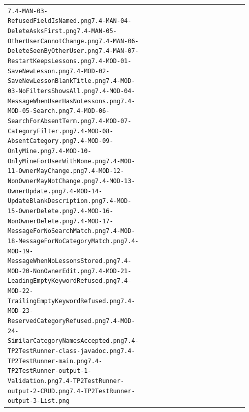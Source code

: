 \documentclass[10pt]{article}
\begin{document}
\begin{longtable}{@{}>{\raggedright\arraybackslash}p{0.07\linewidth} >{\raggedright\arraybackslash}p{0.33\linewidth} >{\raggedright\arraybackslash}p{0.54\linewidth}@{}}
\texttt{7.4-MAN-03-RefusedFieldIsNamed.png}\newline \texttt{7.4-MAN-04-DeleteAsksFirst.png}\newline \texttt{7.4-MAN-05-OtherUserCannotChange.png}\newline \texttt{7.4-MAN-06-DeleteSeenByOtherUser.png}\newline \texttt{7.4-MAN-07-RestartKeepsLessons.png}\newline \texttt{7.4-MOD-01-SaveNewLesson.png}\newline \texttt{7.4-MOD-02-SaveNewLessonBlankTitle.png}\newline \texttt{7.4-MOD-03-NoFiltersShowsAll.png}\newline \texttt{7.4-MOD-04-MessageWhenUserHasNoLessons.png}\newline \texttt{7.4-MOD-05-Search.png}\newline \texttt{7.4-MOD-06-SearchForAbsentTerm.png}\newline \texttt{7.4-MOD-07-CategoryFilter.png}\newline \texttt{7.4-MOD-08-AbsentCategory.png}\newline \texttt{7.4-MOD-09-OnlyMine.png}\newline \texttt{7.4-MOD-10-OnlyMineForUserWithNone.png}\newline \texttt{7.4-MOD-11-OwnerMayChange.png}\newline \texttt{7.4-MOD-12-NonOwnerMayNotChange.png}\newline \texttt{7.4-MOD-13-OwnerUpdate.png}\newline \texttt{7.4-MOD-14-UpdateBlankDescription.png}\newline \texttt{7.4-MOD-15-OwnerDelete.png}\newline \texttt{7.4-MOD-16-NonOwnerDelete.png}\newline \texttt{7.4-MOD-17-MessageForNoSearchMatch.png}\newline \texttt{7.4-MOD-18-MessageForNoCategoryMatch.png}\newline \texttt{7.4-MOD-19-MessageWhenNoLessonsStored.png}\newline \texttt{7.4-MOD-20-NonOwnerEdit.png}\newline \texttt{7.4-MOD-21-LeadingEmptyKeywordRefused.png}\newline \texttt{7.4-MOD-22-TrailingEmptyKeywordRefused.png}\newline \texttt{7.4-MOD-23-ReservedCategoryRefused.png}\newline \texttt{7.4-MOD-24-SimilarCategoryNamesAccepted.png}\newline \texttt{7.4-TP2TestRunner-class-javadoc.png}\newline \texttt{7.4-TP2TestRunner-main.png}\newline \texttt{7.4-TP2TestRunner-output-1-Validation.png}\newline \texttt{7.4-TP2TestRunner-output-2-CRUD.png}\newline \texttt{7.4-TP2TestRunner-output-3-List.png}\newline 
\end{longtable}
\end{document}
